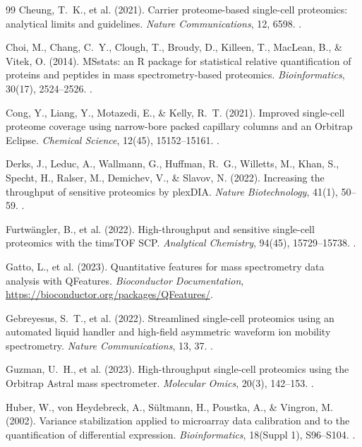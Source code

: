 \documentclass[11pt,twoside,openright]{book}
\begin{document}
\begin{thebibliography}{99}
Cheung, T.~K., et al. (2021). Carrier proteome-based single-cell proteomics: analytical limits and guidelines. \textit{Nature Communications}, 12, 6598. .

Choi, M., Chang, C.~Y., Clough, T., Broudy, D., Killeen, T., MacLean, B., \& Vitek, O. (2014). MSstats: an R package for statistical relative quantification of proteins and peptides in mass spectrometry-based proteomics. \textit{Bioinformatics}, 30(17), 2524--2526. .

Cong, Y., Liang, Y., Motazedi, E., \& Kelly, R.~T. (2021). Improved single-cell proteome coverage using narrow-bore packed capillary columns and an Orbitrap Eclipse. \textit{Chemical Science}, 12(45), 15152--15161. .

Derks, J., Leduc, A., Wallmann, G., Huffman, R.~G., Willetts, M., Khan, S., Specht, H., Ralser, M., Demichev, V., \& Slavov, N. (2022). Increasing the throughput of sensitive proteomics by plexDIA. \textit{Nature Biotechnology}, 41(1), 50--59. .

Furtw\"angler, B., et al. (2022). High-throughput and sensitive single-cell proteomics with the timsTOF SCP. \textit{Analytical Chemistry}, 94(45), 15729--15738. .

Gatto, L., et al. (2023). Quantitative features for mass spectrometry data analysis with QFeatures. \textit{Bioconductor Documentation}, \url{https://bioconductor.org/packages/QFeatures/}.

Gebreyesus, S.~T., et al. (2022). Streamlined single-cell proteomics using an automated liquid handler and high-field asymmetric waveform ion mobility spectrometry. \textit{Nature Communications}, 13, 37. .

Guzman, U.~H., et al. (2023). High-throughput single-cell proteomics using the Orbitrap Astral mass spectrometer. \textit{Molecular Omics}, 20(3), 142--153. .

Huber, W., von Heydebreck, A., S\"ultmann, H., Poustka, A., \& Vingron, M. (2002). Variance stabilization applied to microarray data calibration and to the quantification of differential expression. \textit{Bioinformatics}, 18(Suppl 1), S96--S104. .


\end{thebibliography}
\end{document}
